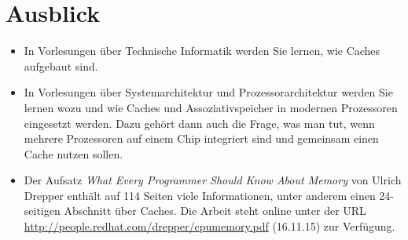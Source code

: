 



\section{Ausblick}

\begin{itemize}
\item In Vorlesungen über Technische Informatik werden Sie lernen, wie
  \zB Caches aufgebaut sind.
\item In Vorlesungen über Systemarchitektur und Prozessorarchitektur
  werden Sie lernen wozu und wie Caches und Assoziativspeicher in
  modernen Prozessoren eingesetzt werden.  Dazu gehört dann auch die
  Frage, was man tut, wenn mehrere Prozessoren auf einem Chip
  integriert sind und gemeinsam einen Cache nutzen sollen.
\item Der Aufsatz \emph{What Every Programmer Should Know About
    Memory} von Ulrich Drepper enthält auf 114 Seiten viele
  Informationen, unter anderem einen 24-seitigen Abschnitt über
  Caches.  Die Arbeit steht online unter der URL
  \url{http://people.redhat.com/drepper/cpumemory.pdf} (16.11.15) zur
  Verfügung.
\end{itemize}

\cleardoublepage


